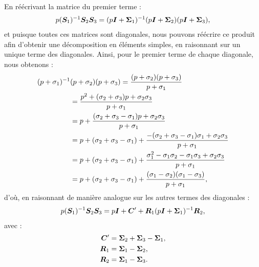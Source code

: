 En réécrivant la matrice du premier terme :
\begin{align}
	p (\bm{S}_1)^{-1} \bm{S}_2 \bm{S}_3 =
	(p\bm{I} + \bm{\Sigma}_1)^{-1}
	(p\bm{I} + \bm{\Sigma}_2)
	(p\bm{I} + \bm{\Sigma}_3) ,
\end{align}
et puisque toutes ces matrices sont diagonales, nous pouvons réécrire ce produit
afin d'obtenir une décomposition en éléments simples, en raisonnant
sur un unique terme des diagonales. Ainsi, pour le
premier terme de chaque diagonale, nous obtenons :
\begin{equation}
	\begin{aligned}
		(p + \sigma_1)^{-1} &
		(p + \sigma_2) (p + \sigma_3)
		= \frac{(p + \sigma_2) (p + \sigma_3)}
			{p + \sigma_1} \\
		&= \frac{p^2 + (\sigma_2 + \sigma_3) p + 
			\sigma_2\sigma_3}{p + \sigma_1} \\
		&= p + \frac{(\sigma_2 + \sigma_3 - \sigma_1) p 
			+ \sigma_2\sigma_3}{p + \sigma_1} \\
		&= p + (\sigma_2 + \sigma_3 - \sigma_1)
			+ \frac{-(\sigma_2 + \sigma_3 - \sigma_1)
			\sigma_1 + \sigma_2\sigma_3}{p + \sigma_1} \\
		&= p + (\sigma_2 + \sigma_3 - \sigma_1)
			+ \frac{\sigma_1^2 - \sigma_1 \sigma_2 - \sigma_1 \sigma_3 + \sigma_2\sigma_3}{p + \sigma_1} \\
		&= p + (\sigma_2 + \sigma_3 - \sigma_1)
			+ \frac{(\sigma_1 - \sigma_2) (\sigma_1 - \sigma_3)}{p + \sigma_1} ,
	\end{aligned}
\end{equation}
d'où, en raisonnant de manière analogue sur les autres
termes des diagonales :
\begin{align}
	p (\bm{S}_1)^{-1} \bm{S}_2 \bm{S}_3 =
	p \bm{I} + \bm{C}'
	+ \bm{R}_1 (p \bm{I} + \bm{\Sigma}_1)^{-1} \bm{R}_2 ,
\end{align}
avec :
\begin{subequations}
	\begin{align}
		\bm{C}' &=
		\bm{\Sigma}_2 +
		\bm{\Sigma}_3 -
		\bm{\Sigma}_1 ,
		\\
		\bm{R}_1 &=
		\bm{\Sigma}_1 -
		\bm{\Sigma}_2 ,
		\\
		\bm{R}_2 &=
		\bm{\Sigma}_1 -
		\bm{\Sigma}_3 .
	\end{align}
\end{subequations}

